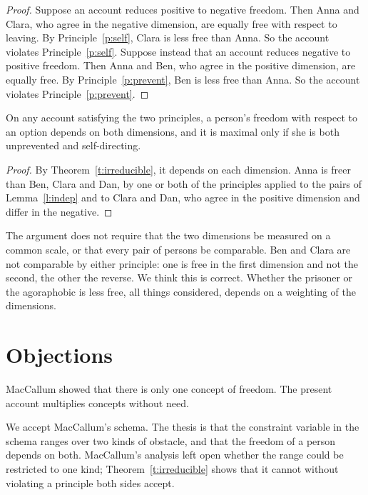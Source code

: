 \documentclass{situationist-preprint}
\begin{document}
\begin{proof}
Suppose an account reduces positive to negative freedom. Then Anna and Clara, who agree in the negative dimension, are equally free with respect to leaving. By Principle~\ref{p:self}, Clara is less free than Anna. So the account violates Principle~\ref{p:self}. Suppose instead that an account reduces negative to positive freedom. Then Anna and Ben, who agree in the positive dimension, are equally free. By Principle~\ref{p:prevent}, Ben is less free than Anna. So the account violates Principle~\ref{p:prevent}.
\end{proof}

\begin{corollary}\label{c:both}
On any account satisfying the two principles, a person's freedom with respect to an option depends on both dimensions, and it is maximal only if she is both unprevented and self-directing.
\end{corollary}

\begin{proof}
By Theorem~\ref{t:irreducible}, it depends on each dimension. Anna is freer than Ben, Clara and Dan, by one or both of the principles applied to the pairs of Lemma~\ref{l:indep} and to Clara and Dan, who agree in the positive dimension and differ in the negative.
\end{proof}

The argument does not require that the two dimensions be measured on a common scale, or that every pair of persons be comparable. Ben and Clara are not comparable by either principle: one is free in the first dimension and not the second, the other the reverse. We think this is correct. Whether the prisoner or the agoraphobic is less free, all things considered, depends on a weighting of the dimensions.

\section{Objections}

\begin{objection}
MacCallum showed that there is only one concept of freedom. The present account multiplies concepts without need.
\end{objection}

\begin{reply}
We accept MacCallum's schema. The thesis is that the constraint variable in the schema ranges over two kinds of obstacle, and that the freedom of a person depends on both. MacCallum's analysis left open whether the range could be restricted to one kind; Theorem~\ref{t:irreducible} shows that it cannot without violating a principle both sides accept.
\end{reply}
\end{document}

